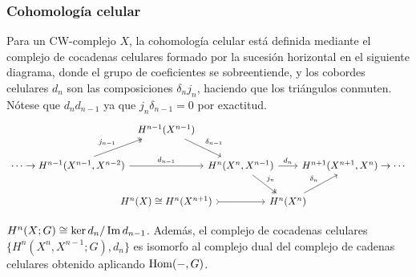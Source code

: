 \documentclass[TA.tex]{subfiles}
\begin{document}
\subsubsection{Cohomología celular}
Para un CW-complejo $X$, la cohomología celular está definida mediante el complejo de cocadenas celulares formado por la sucesión horizontal en el siguiente diagrama, donde el grupo de coeficientes se sobreentiende, y los cobordes celulares $d_n$ son las composiciones $\delta_nj_n$, haciendo que los triángulos conmuten. Nótese que $d_nd_{n-1}$ ya que $j_n\delta_{n-1}=0$ por exactitud. 
\[
\begin{tikzcd}[column sep=-13]                                                                      & H^{n-1}(X^{n-1})\arrow[dr, "\delta_{n-1}"] & & & \\
\cdots\to H^{n-1}(X^{n-1},X^{n-2})\arrow[rr, "d_{n-1}"]\arrow[ur, twoheadrightarrow, "j_{n-1}"] & & H^n(X^n,X^{n-1})\arrow[dr, twoheadrightarrow, "j_n"]\arrow[rr, "d_n"] & & H^{n+1}(X^{n+1}, X^n)\to\cdots\\
&  H^n(X)\cong H^n(X^{n+1})\arrow[rr, rightarrowtail]& & H^n(X^n)\arrow[ur, "\delta_n"] &
\end{tikzcd}
\]
\begin{teorema}
$H^n(X;G)\cong\ker d_n/\operatorname{Im} d_{n-1}$. Además, el complejo de cocadenas celulares $\{H^n(X^n,X^{n-1};G),d_n\}$ es isomorfo al complejo dual del complejo de cadenas celulares obtenido aplicando $\operatorname{Hom}(-,G)$.
\end{teorema}
\end{document}
